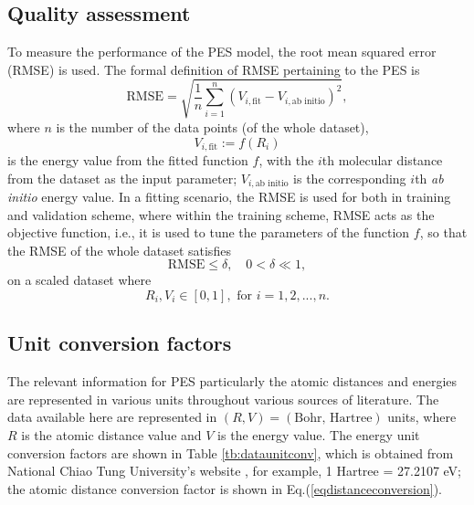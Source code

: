\documentclass[12pt]{article}
\begin{document}
\subsection{Quality assessment}
To measure the performance of the PES model, the root mean squared error (RMSE) is used. The formal definition of RMSE  pertaining to the PES is
\begin{equation}
    \text{RMSE} = \sqrt{\frac{1}{n}\sum_{i=1}^n (V_{i,\text{fit}} - V_{i,\text{ab initio}})^2} ,
    \label{eq:rmse}
\end{equation}
where $n$ is the number of the data points (of the whole dataset), 
\begin{equation}
    V_{i,\text{fit}} := f(R_i)
\end{equation}
is the energy value from the fitted function $f$, with the $i$th molecular distance from the dataset as the input parameter; $V_{i,\text{ab initio}}$ is the corresponding $i$th \textit{ab initio} energy value.
In a fitting scenario, the RMSE is used for both in training and validation scheme, where within the training scheme, RMSE acts as the objective function, i.e., it is used to tune the parameters of the function $f$, so that the RMSE of the whole dataset satisfies
\begin{equation}
    \text{RMSE} \leq \delta, \quad 0 < \delta \ll 1,
    \label{eq:rmse2}
\end{equation}
on a scaled dataset where 
\begin{equation}
    R_i,V_i \in [0,1], \text{ for } i = 1,2,...,n.
    \label{eq:normalized}
\end{equation}

\subsection{Unit conversion factors}
The relevant information for PES particularly the atomic distances and energies are represented in various units throughout various sources of literature. The data available here are represented in $(R, V) = (\text{Bohr, Hartree})$ units, where $R$ is the atomic distance value and $V$ is the energy value. The energy unit conversion factors are shown in Table \ref{tb:dataunitconv}, which is obtained from National Chiao Tung University's website \cite{energyconversiontable}, for example, 1 Hartree = 27.2107 eV; the atomic distance conversion factor is shown in Eq.(\ref{eqdistanceconversion}).
\end{document}
